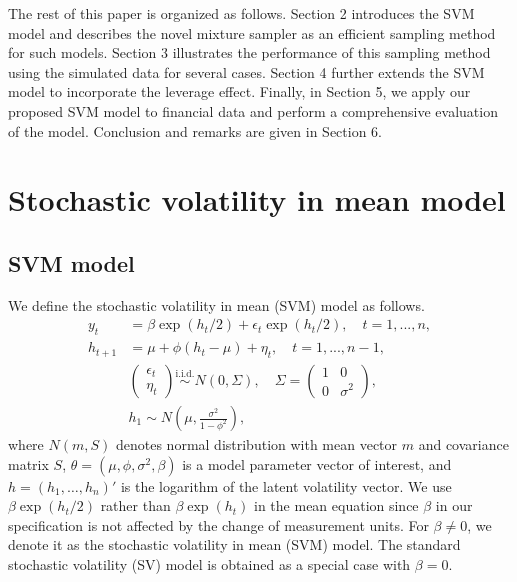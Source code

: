 The rest of this paper is organized as follows.
Section 2 introduces the SVM model and describes the novel mixture sampler as an efficient sampling method for such models. Section 3 illustrates the performance of this sampling method using the simulated data for several cases. Section 4 further extends the SVM model to incorporate the leverage effect. Finally, in Section 5, we apply our proposed SVM model to financial data and perform a comprehensive evaluation of the model. Conclusion and remarks are given in Section 6.

\section{Stochastic volatility in mean model}
\subsection{SVM model}
We define the stochastic volatility in mean (SVM) model as follows.
\begin{align} 
        y_t &= \beta \exp(h_t/2) + \epsilon_t \exp(h_t/2), \quad
        t = 1, ..., n, \label{SVM obs} \\ 
        h_{t+1} &= \mu + \phi(h_t - \mu) + \eta_t, \quad
        t = 1, ..., n-1, \label{SVM state} \\
        &\begin{pmatrix}
            \epsilon_t \\
            \eta_t
        \end{pmatrix}
        \overset{\text{i.i.d.}}{\sim} N(0, \Sigma), \quad
        \Sigma = 
        \begin{pmatrix}
            1 & 0 \\
            0 & \sigma^2
        \end{pmatrix},  \label{eq:error_without_leverage}\\
        &h_1 \sim N \left(\mu, \frac{\sigma^2}{1-\phi^2} \right),
\end{align}
where $N(m,S)$ denotes normal distribution with mean vector $m$ and covariance matrix $S$, $\theta = (\mu, \phi, \sigma^2, \beta)$ is a model parameter vector of interest, and $h = (h_1, \dots, h_n)'$ is the logarithm of the latent volatility vector. We use $\beta \exp(h_t/2)$ rather than $\beta \exp(h_t)$ in the mean equation since $\beta$ in our specification is not affected by the change of measurement units. 
For $\beta \neq 0$, we denote it as the stochastic volatility in mean (SVM) model. The standard stochastic volatility (SV) model is obtained as a special case with $\beta =0$.  
